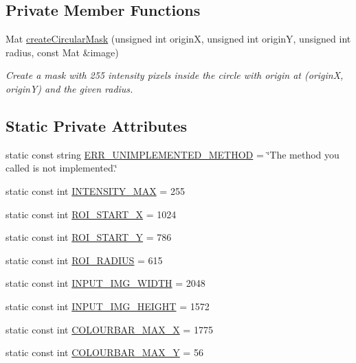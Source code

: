 \subsection*{Private Member Functions}
\begin{DoxyCompactItemize}
\item 
Mat \hyperlink{classmultiscale_1_1analysis_1_1CircularMatFactory_a94f2562c9045f2373b3e2736608de8c7}{create\-Circular\-Mask} (unsigned int origin\-X, unsigned int origin\-Y, unsigned int radius, const Mat \&image)
\begin{DoxyCompactList}\small\item\em Create a mask with 255 intensity pixels inside the circle with origin at (origin\-X, origin\-Y) and the given radius. \end{DoxyCompactList}\end{DoxyCompactItemize}
\subsection*{Static Private Attributes}
\begin{DoxyCompactItemize}
\item 
static const string \hyperlink{classmultiscale_1_1analysis_1_1CircularMatFactory_a7f4120aa31ff324ddb5c90e14cfeeb6d}{E\-R\-R\-\_\-\-U\-N\-I\-M\-P\-L\-E\-M\-E\-N\-T\-E\-D\-\_\-\-M\-E\-T\-H\-O\-D} = \char`\"{}The method you called is not implemented.\char`\"{}
\item 
static const int \hyperlink{classmultiscale_1_1analysis_1_1CircularMatFactory_a37f5cabf6d03d157cf96fb745e1da0ca}{I\-N\-T\-E\-N\-S\-I\-T\-Y\-\_\-\-M\-A\-X} = 255
\item 
static const int \hyperlink{classmultiscale_1_1analysis_1_1CircularMatFactory_a0e2da07df4736b0ec21567721ae94af5}{R\-O\-I\-\_\-\-S\-T\-A\-R\-T\-\_\-\-X} = 1024
\item 
static const int \hyperlink{classmultiscale_1_1analysis_1_1CircularMatFactory_a94368fde6348afd7074491c2cf333910}{R\-O\-I\-\_\-\-S\-T\-A\-R\-T\-\_\-\-Y} = 786
\item 
static const int \hyperlink{classmultiscale_1_1analysis_1_1CircularMatFactory_af26e9372a9bfb4428e9bdef952afedff}{R\-O\-I\-\_\-\-R\-A\-D\-I\-U\-S} = 615
\item 
static const int \hyperlink{classmultiscale_1_1analysis_1_1CircularMatFactory_a1c85fef366f2b3674a0c58394e441908}{I\-N\-P\-U\-T\-\_\-\-I\-M\-G\-\_\-\-W\-I\-D\-T\-H} = 2048
\item 
static const int \hyperlink{classmultiscale_1_1analysis_1_1CircularMatFactory_afdc7e6c3051b6767fa9e1a38257f1aa2}{I\-N\-P\-U\-T\-\_\-\-I\-M\-G\-\_\-\-H\-E\-I\-G\-H\-T} = 1572
\item 
static const int \hyperlink{classmultiscale_1_1analysis_1_1CircularMatFactory_a57e022b6cb2066b59e6f1988986ce6ad}{C\-O\-L\-O\-U\-R\-B\-A\-R\-\_\-\-M\-A\-X\-\_\-\-X} = 1775
\item 
static const int \hyperlink{classmultiscale_1_1analysis_1_1CircularMatFactory_a288197056f07989be0503e08a2745bed}{C\-O\-L\-O\-U\-R\-B\-A\-R\-\_\-\-M\-A\-X\-\_\-\-Y} = 56
\end{DoxyCompactItemize}

